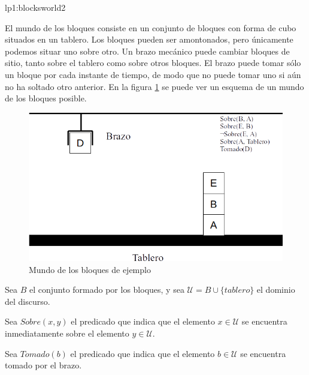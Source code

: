 \begin{defproblem}{lp1:blocksworld2}%
	\begin{onlyproblem}%
		El mundo de los bloques consiste en un conjunto de bloques con forma de cubo situados en un tablero. Los bloques pueden ser amontonados, pero únicamente podemos situar uno sobre otro. Un brazo mecánico puede cambiar bloques de sitio, tanto sobre el tablero como sobre otros bloques. El brazo puede tomar sólo un bloque por cada instante de tiempo, de modo que no puede tomar uno si aún no ha soltado otro anterior. En la figura \ref{fig:ejemplo-bloques2} se puede ver un esquema de un mundo de los bloques posible.
		
		\begin{figure}[b]
			\centering
			\includegraphics[width=0.7\linewidth]{Blocksworld-ejemplo}
			\caption[Mundo de los bloques de ejemplo]{Mundo de los bloques de ejemplo}
			\label{fig:ejemplo-bloques2}
		\end{figure}
		
		Sea $ B $ el conjunto formado por los bloques, y sea $ \mathcal{U} = B \cup \{tablero\} $ el dominio del discurso.
		
		Sea $ Sobre(x, y) $ el predicado que indica que el elemento $ x \in \mathcal{U} $ se encuentra inmediatamente sobre el elemento $ y \in \mathcal{U} $.
		
		Sea $ Tomado(b) $ el predicado que indica que el elemento $ b \in \mathcal{U} $ se encuentra tomado por el brazo.
		

\end{onlyproblem}
\end{defproblem}
